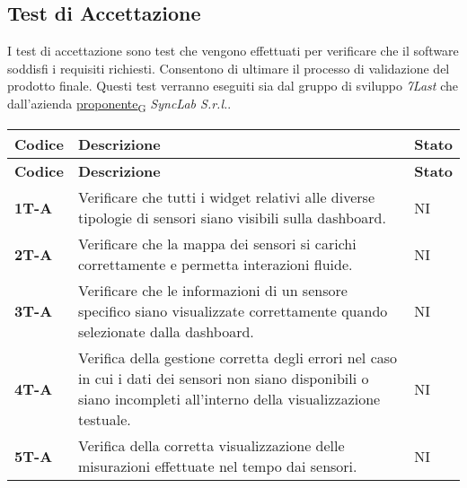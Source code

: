 \subsection{Test di Accettazione}
I test di accettazione sono test che vengono effettuati per verificare che il software soddisfi i requisiti richiesti. Consentono di ultimare il processo di validazione del prodotto finale. Questi test verranno eseguiti sia dal gruppo di sviluppo \textit{7Last} che dall'azienda \href{https://7last.github.io/docs/rtb/documentazione-interna/glossario\#proponente}{proponente\textsubscript{G}} \textit{SyncLab S.r.l.}. \\
\begin{longtable}{|>{\raggedright\arraybackslash}m{}|>{\raggedright\arraybackslash}m{}|>{\raggedright\arraybackslash}m{}|}
	\hline
	\textbf{Codice} & \textbf{Descrizione}                                                                                                                                                  & \textbf{Stato} \\
	\hline
	\endfirsthead
	\hline
	\textbf{Codice} & \textbf{Descrizione}                                                                                                                                                  & \textbf{Stato} \\
	\endhead
	\textbf{1T-A}   & Verificare che tutti i widget relativi alle diverse tipologie di sensori siano visibili sulla dashboard.                                                              & NI             \\
	\hline
	\textbf{2T-A}   & Verificare che la mappa dei sensori si carichi correttamente e permetta interazioni fluide.                                                                           & NI             \\
	\hline
	\textbf{3T-A}   & Verificare che le informazioni di un sensore specifico siano visualizzate correttamente quando selezionate dalla dashboard.                                           & NI             \\
	\hline
	\textbf{4T-A}   & Verifica della gestione corretta degli errori nel caso in cui i dati dei sensori non siano disponibili o siano incompleti all’interno della visualizzazione testuale. & NI             \\
	\hline
	\textbf{5T-A}   & Verifica della corretta visualizzazione delle misurazioni effettuate nel tempo dai sensori.                                                                           & NI             \\

\end{longtable}
